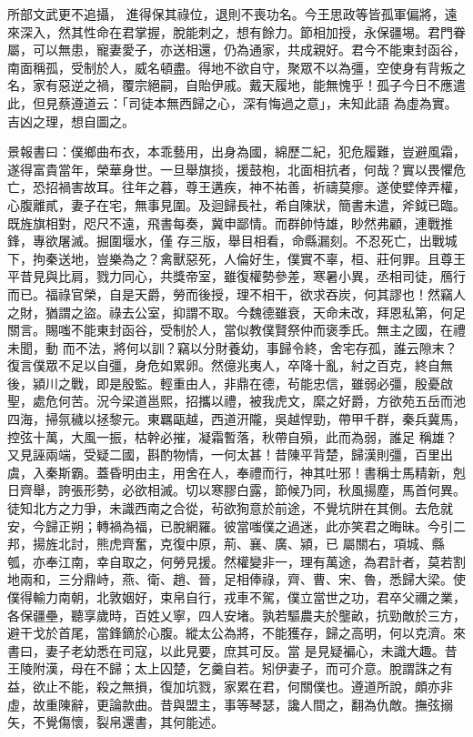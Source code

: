 \begin{pinyinscope}
 所部文武更不追攝，
 進得保其祿位，退則不喪功名。今王思政等皆孤軍偏將，遠來深入，然其性命在君掌握，脫能刺之，想有餘力。節相加授，永保疆埸。君門眷屬，可以無患，寵妻愛子，亦送相還，仍為通家，共成親好。君今不能東封函谷，南面稱孤，受制於人，威名頓盡。得地不欲自守，聚眾不以為彊，空使身有背叛之名，家有惡逆之禍，覆宗絕嗣，自貽伊戚。戴天履地，能無愧乎！孤子今日不應遣此，但見蔡遵道云：「司徒本無西歸之心，深有悔過之意」，未知此語
 為虛為實。吉凶之理，想自圖之。



 景報書曰：僕鄉曲布衣，本乖藝用，出身為國，綿歷二紀，犯危履難，豈避風霜，遂得富貴當年，榮華身世。一旦舉旗掞，援鼓枹，北面相抗者，何哉？實以畏懼危亡，恐招禍害故耳。往年之暮，尊王遘疾，神不祐善，祈禱莫瘳。遂使嬖倖弄權，心腹離貳，妻子在宅，無事見圍。及迴歸長社，希自陳狀，簡書未遣，斧鉞已臨。既旌旗相對，咫尺不遠，飛書每奏，冀申鄙情。而群帥恃雄，眇然弗顧，連戰推鋒，專欲屠滅。掘圍堰水，僅
 存三版，舉目相看，命縣漏刻。不忍死亡，出戰城下，拘秦送地，豈樂為之？禽獸惡死，人倫好生，僕實不辜，桓、莊何罪。且尊王平昔見與比肩，戮力同心，共獎帝室，雖復權勢參差，寒暑小異，丞相司徒，鴈行而已。福祿官榮，自是天爵，勞而後授，理不相干，欲求吞炭，何其謬也！然竊人之財，猶謂之盜。祿去公室，抑謂不取。今魏德雖衰，天命未改，拜恩私第，何足關言。賜嗤不能東封函谷，受制於人，當似教僕賢祭仲而褒季氏。無主之國，在禮未聞，動
 而不法，將何以訓？竊以分財養幼，事歸令終，舍宅存孤，誰云隙末？復言僕眾不足以自彊，身危如累卵。然億兆夷人，卒降十亂，紂之百克，終自無後，潁川之戰，即是殷監。輕重由人，非鼎在德，茍能忠信，雖弱必彊，殷憂啟聖，處危何苦。況今梁道邕熙，招攜以禮，被我虎文，縻之好爵，方欲苑五岳而池四海，掃氛穢以拯黎元。東羈甌越，西道汧隴，吳越悍勁，帶甲千群，秦兵冀馬，控弦十萬，大風一振，枯幹必摧，凝霜暫落，秋帶自殞，此而為弱，誰足
 稱雄？又見誣兩端，受疑二國，斟酌物情，一何太甚！昔陳平背楚，歸漢則彊，百里出虞，入秦斯霸。蓋昏明由主，用舍在人，奉禮而行，神其吐邪！書稱士馬精新，剋日齊舉，誇張形勢，必欲相滅。切以寒膠白露，節候乃同，秋風揚塵，馬首何異。徒知北方之力爭，未識西南之合從，茍欲狥意於前途，不覺坑阱在其側。去危就安，今歸正朔；轉禍為福，已脫網羅。彼當嗤僕之過迷，此亦笑君之晦昧。今引二邦，揚旌北討，熊虎齊奮，克復中原，荊、襄、廣、潁，已
 屬關右，項城、縣瓠，亦奉江南，幸自取之，何勞見援。然權變非一，理有萬途，為君計者，莫若割地兩和，三分鼎峙，燕、衛、趙、晉，足相俸祿，齊、曹、宋、魯，悉歸大梁。使僕得輸力南朝，北敦姻好，束帛自行，戎車不駕，僕立當世之功，君卒父禰之業，各保疆壘，聽享歲時，百姓乂寧，四人安堵。孰若驅農夫於壟畝，抗勁敵於三方，避干戈於首尾，當鋒鏑於心腹。縱太公為將，不能獲存，歸之高明，何以克濟。來書曰，妻子老幼悉在司寇，以此見要，庶其可反。當
 是見疑褊心，未識大趣。昔王陵附漢，母在不歸；太上囚楚，乞羹自若。矧伊妻子，而可介意。脫謂誅之有益，欲止不能，殺之無損，復加坑戮，家累在君，何關僕也。遵道所說，頗亦非虛，故重陳辭，更論款曲。昔與盟主，事等琴瑟，讒人間之，翻為仇敵。撫弦搦矢，不覺傷懷，裂帛還書，其何能述。




\end{pinyinscope}
